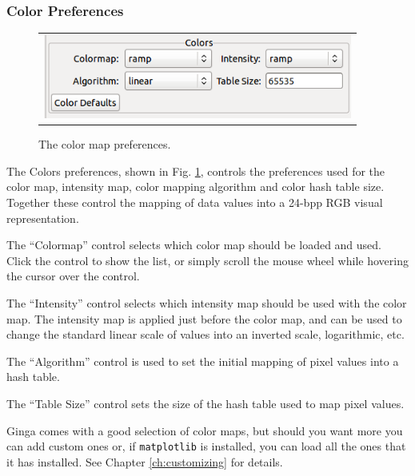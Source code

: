 \documentclass[11pt]{report}
\begin{document}
\subsubsection{Color Preferences}
\begin{figure}
  \begin{center}
    \begin{tabular}{c}
      \includegraphics[width=4in]{cmap-prefs.png}
    \end{tabular}
  \end{center}
  \caption[example] 
          { \label{fig:prefs-colors} 
            The color map preferences.} 
\end{figure} 
The Colors preferences, shown in Fig. \ref{fig:prefs-colors}, controls
the preferences used for the color map, intensity map, color mapping
algorithm and color hash table size.
Together these control the mapping of data values into a 24-bpp RGB
visual representation.

The ``Colormap'' control selects which color map should be loaded and
used.  Click the control to show the list, or simply scroll the mouse
wheel while hovering the cursor over the control.

The ``Intensity'' control selects which intensity map should be used
with the color map.  The intensity map is applied just before the color
map, and can be used to change the standard linear scale of values into
an inverted scale, logarithmic, etc.

The ``Algorithm'' control is used to set the initial mapping of pixel
values into a hash table.

The ``Table Size'' control sets the size of the hash table used to map
pixel values.

Ginga comes with a good selection of color maps, but should you want
more you can add custom ones or, if {\tt matplotlib} is installed, you
can load all the ones that it has installed.  See Chapter
\ref{ch:customizing} for details.
\end{document}
